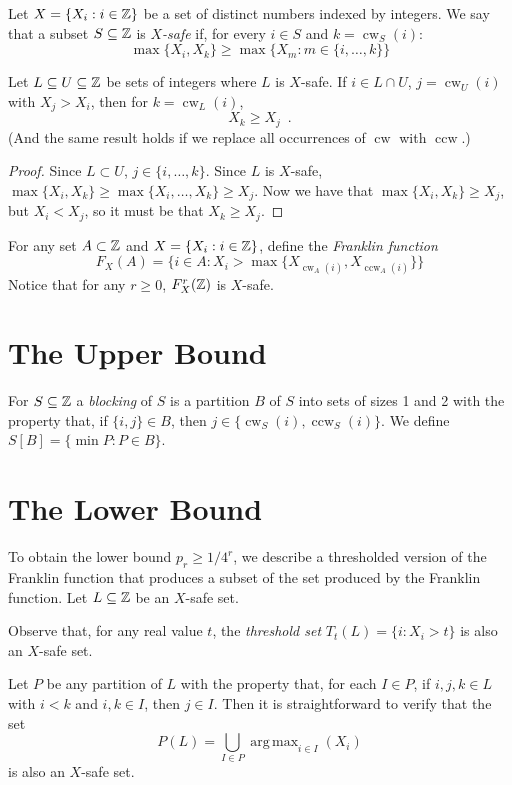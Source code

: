 \documentclass{patmorin}
\DeclareMathOperator*{\argmax}{arg\,max}
\DeclareMathOperator{\cw}{cw}
\DeclareMathOperator{\ccw}{ccw}
\begin{document}
Let $X=\{X_i:i\in \mathbb{Z}\}$ be a set of distinct numbers indexed by integers.
We say that a subset $S\subseteq\mathbb{Z}$
is \emph{$X$-safe} if, for every $i\in S$ and $k= \cw_{S}(i)$:
\[
    \max\{X_i,X_k\} \ge \max\{X_m: m\in \{i,\ldots,k\}\}
\]

\begin{lem}
   Let $L\subseteq U\subseteq\mathbb{Z}$ be sets of integers where $L$
   is $X$-safe.  If $i\in L\cap U$, $j=\cw_{U}(i)$ with $X_j > X_i$,
   then for $k=\cw_{L}(i)$,
   \[
         X_k \ge X_j \enspace . 
   \]
   (And the same result holds if we replace all occurrences of $\cw$
   with $\ccw$.)
\end{lem}

\begin{proof}
   Since $L\subset U$, $j\in \{i,\ldots,k\}$.  Since $L$ is $X$-safe,
   $\max\{X_i,X_k\} \ge \max\{X_i,\ldots,X_k\} \ge X_j$.  Now we have
   that $\max\{X_i,X_k\} \ge X_j$, but $X_i < X_j$, so it must be that
   $X_k\ge X_j$.
\end{proof}

For any set $A\subset\mathbb{Z}$ and $X=\{X_i:i\in \mathbb{Z}\}$, define the \emph{Franklin function}
\[
   F_X(A) = \{ i\in A : X_{i} > \max\{X_{\cw_A(i)},X_{\ccw_A(i)}\} \}
\]
Notice that for any $r\ge 0$, $F^r_X(\mathbb{Z})$ is $X$-safe.

\section{The Upper Bound}

For $S\subseteq\mathbb{Z}$ a \emph{blocking} of $S$ is a partition $B$ of $S$
into sets of sizes 1 and 2 with the property that, if $\{i,j\}\in B$, then
$j\in\{\cw_S(i),\ccw_S(i)\}$.  We define $S[B] = \{\min P : P\in B\}$.  

\section{The Lower Bound}

To obtain the lower bound $p_r \ge 1/4^r$, we describe a thresholded
version of the Franklin function that produces a subset of the set
produced by the Franklin function.  Let $L\subseteq\mathbb{Z}$ be an $X$-safe set.

Observe that, for any real value $t$, the \emph{threshold set}
$T_t(L)=\{i:X_i> t\}$ is also an $X$-safe set.  

Let $P$ be any partition of $L$ with the property that, for each $I\in
P$, if $i,j,k\in L$ with $i < k$ and $i,k\in I$, then $j\in I$. Then it
is straightforward to verify that the set
\[
     P(L) = \bigcup_{I\in P} \argmax_{i\in I}(X_i)
\]
is also an $X$-safe set.
\end{document}
